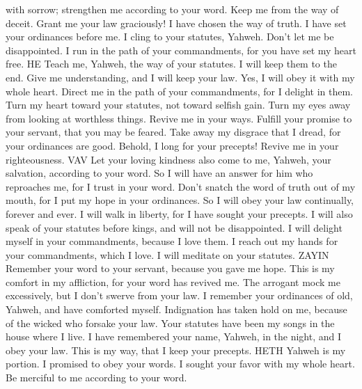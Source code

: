with sorrow; strengthen me according to your word.  Keep
me from the way of deceit. Grant me your law graciously! 
I have chosen the way of truth. I have set your ordinances before me.
 I cling to your statutes, Yahweh. Don't let me be
disappointed.  I run in the path of your commandments,
for you have set my heart free. HE  Teach me, Yahweh, the
way of your statutes. I will keep them to the end.  Give
me understanding, and I will keep your law. Yes, I will obey it with my
whole heart.  Direct me in the path of your commandments,
for I delight in them.  Turn my heart toward your
statutes, not toward selfish gain.  Turn my eyes away
from looking at worthless things. Revive me in your ways.
 Fulfill your promise to your servant, that you may be
feared.  Take away my disgrace that I dread, for your
ordinances are good.  Behold, I long for your precepts!
Revive me in your righteousness. VAV  Let your loving
kindness also come to me, Yahweh, your salvation, according to your
word.  So I will have an answer for him who reproaches
me, for I trust in your word.  Don't snatch the word of
truth out of my mouth, for I put my hope in your ordinances.
 So I will obey your law continually, forever and ever.
 I will walk in liberty, for I have sought your precepts.
 I will also speak of your statutes before kings, and
will not be disappointed.  I will delight myself in your
commandments, because I love them.  I reach out my hands
for your commandments, which I love. I will meditate on your statutes.
ZAYIN  Remember your word to your servant, because you
gave me hope.  This is my comfort in my affliction, for
your word has revived me.  The arrogant mock me
excessively, but I don't swerve from your law.  I
remember your ordinances of old, Yahweh, and have comforted myself.
 Indignation has taken hold on me, because of the wicked
who forsake your law.  Your statutes have been my songs
in the house where I live.  I have remembered your name,
Yahweh, in the night, and I obey your law.  This is my
way, that I keep your precepts. HETH  Yahweh is my
portion. I promised to obey your words.  I sought your
favor with my whole heart. Be merciful to me according to your word.
